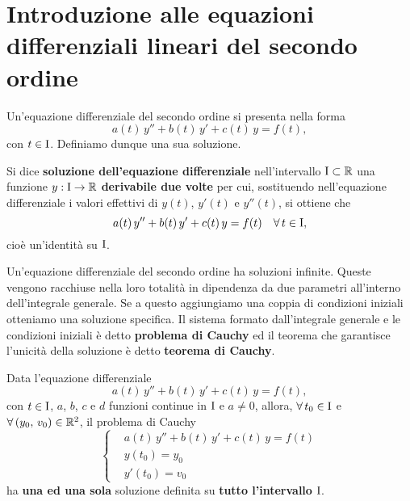 \documentclass[../../analisi2]{subfiles}
\begin{document}
    \chapter{Introduzione alle equazioni differenziali lineari del secondo ordine}

        Un'equazione differenziale del secondo ordine si presenta nella forma
        \[
            a(t) \, y'' + b(t) \, y' + c(t) \, y = f(t),
        \]
        con \(t \in \mathrm{I}\). Definiamo dunque una sua soluzione.

        \begin{definizione}
            Si dice \textbf{soluzione dell'equazione differenziale} nell'intervallo \(\mathrm{I} \subset \mathbb{R}\) una funzione
            \(y : \mathrm{I} \to \mathbb{R}\) \textbf{derivabile due volte} per cui, sostituendo nell'equazione differenziale i valori effettivi
            di \(y(t)\), \(y'(t)\) e \(y''(t)\), si ottiene che
            \[
                a(t) \, y'' + b(t) \, y' + c(t) \, y = f(t) \quad \forall \, t \in \mathrm{I},
            \] cioè un'identità su \(\mathrm{I}\).
        \end{definizione}

        Un'equazione differenziale del secondo ordine ha soluzioni infinite. Queste vengono racchiuse nella loro totalità
        in dipendenza da due parametri all'interno dell'integrale generale. Se a questo aggiungiamo una coppia di condizioni iniziali
        otteniamo una soluzione specifica. Il sistema formato dall'integrale generale e le condizioni iniziali è detto
        \textbf{problema di Cauchy} ed il teorema che garantisce l'unicità della soluzione è detto \textbf{teorema di Cauchy}.

        \begin{teorema}
            Data l'equazione differenziale
            \[
                a(t) \, y'' + b(t) \, y' + c(t) \, y = f(t),
            \]
            con \(t \in \mathrm{I}\), \(a\), \(b\), \(c\) e \(d\) funzioni continue in \(\mathrm{I}\) e \(a \neq 0\), allora,
            \(\forall \, t_0 \in \mathrm{I}\) e \(\forall \, (y_0, \, v_0) \in \mathbb{R}^2\), il problema di Cauchy
            \[
                \left\{
                    \begin{aligned}
                        &a(t) \, y'' + b(t) \, y' + c(t) \, y = f(t)\\
                        &y(t_0) = y_0\\
                        &y'(t_0) = v_0
                    \end{aligned}
                \right.
            \]
            ha \textbf{una ed una sola} soluzione definita su \textbf{tutto l'intervallo} \(\mathrm{I}\).
        \end{teorema}
\end{document}

